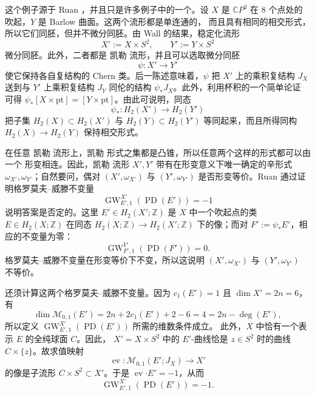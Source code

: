 \begin{example}[非形变等价的六维流形]\label{ex:9-7-1}
这个例子源于 Ruan ，并且只是许多例子中的一个。设 $X$ 是
$\mathbb CP^2$ 在 $8$ 个点处的吹起，$Y$ 是 Barlow 曲面。这两个流形都是单连通的，
而且具有相同的相交形式，所以它们同胚，但并不微分同胚。由 Wall 的结果，稳定化流形
\[
  X':=X\times S^2,\qquad Y':=Y\times S^2
\]
微分同胚。此外，二者都是 凯勒 流形，并且可以选取微分同胚
\[
  \psi:X'\longrightarrow Y'
\]
使它保持各自复结构的 Chern 类。后一陈述意味着，$\psi$ 把 $X'$ 上的乘积复结构 $J_X$
送到与 $Y'$ 上乘积复结构 $J_Y$ 同伦的结构 $\psi_*J_X$。此外，利用杯积的一个简单论证
可得 $\psi_*[X\times\mathrm{pt}]=[Y\times\mathrm{pt}]$。由此可说明，同态
\[
  \psi_*:H_2(X')\longrightarrow H_2(Y')
\]
把子集 $H_2(X)\subset H_2(X')$ 与 $H_2(Y)\subset H_2(Y')$ 等同起来，而且所得同构
$H_2(X)\to H_2(Y)$ 保持相交形式。

在任意 凯勒 流形上，凯勒 形式之集都是凸锥，所以任意两个这样的形式都可以由一个
形变相连。因此，凯勒 流形 $X',Y'$ 带有在形变意义下唯一确定的辛形式
$\omega_{X'},\omega_{Y'}$；自然要问，偶对 $(X',\omega_{X'})$ 与
$(Y',\omega_{Y'})$ 是否形变等价。Ruan 通过证明格罗莫夫--威滕不变量
\[
  \operatorname{GW}_{E',1}^{X'}(\operatorname{PD}(E'))=-1
\]
说明答案是否定的。这里 $E'\in H_2(X';\mathbb Z)$ 是 $X$ 中一个吹起点的类
$E\in H_2(X;\mathbb Z)$ 在同态
$H_2(X;\mathbb Z)\to H_2(X';\mathbb Z)$ 下的像；而对
$F':=\psi_*E'$，相应的不变量为零：
\[
  \operatorname{GW}_{F',1}^{Y'}(\operatorname{PD}(F'))=0.
\]
格罗莫夫--威滕不变量在形变等价下不变，所以这说明
$(X',\omega_{X'})$ 与 $(Y',\omega_{Y'})$ 不等价。

还须计算这两个格罗莫夫--威滕不变量。因为 $c_1(E')=1$ 且
$\dim X'=2n=6$，有
\[
  \dim\mathcal M_{0,1}(E')
  =2n+2c_1(E')+2-6=4=2n-\deg(E'),
\]
所以定义 $\operatorname{GW}_{E',1}^{X'}(\operatorname{PD}(E'))$ 所需的维数条件成立。
此外，$X$ 中恰有一个表示 $E$ 的全纯球面 $C$。因此，
$X'=X\times S^2$ 中的 $E'$-曲线恰是 $z\in S^2$ 时的曲线
$C\times\{z\}$。故求值映射
\[
  \operatorname{ev}:\mathcal M_{0,1}(E';J_X)\longrightarrow X'
\]
的像是子流形 $C\times S^2\subset X'$。于是
$\operatorname{ev}\mathbin{\boldsymbol\cdot}E'=-1$，从而
\[
  \operatorname{GW}_{E',1}^{X'}(\operatorname{PD}(E'))=-1.
\]


\end{example}
